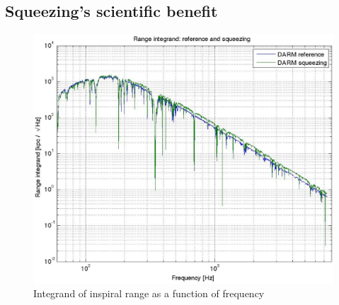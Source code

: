 
\subsection{Squeezing's scientific benefit}


\begin{figure}
\begin{center}
\includegraphics[height=0.5\paperheight, width=0.5\paperwidth,keepaspectratio]{range_integrand.eps}
\caption{Integrand of inspiral range as a function of frequency}
\end{center}
\end{figure}
